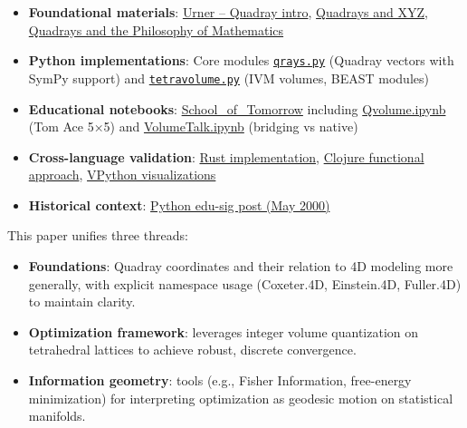 \documentclass[
]{article}
\providecommand{\tightlist}{%
  \setlength{\itemsep}{0pt}\setlength{\parskip}{0pt}}
\begin{document}
\begin{itemize}
\tightlist
\item
  \textbf{Foundational materials}:
  \href{https://www.grunch.net/synergetics/quadintro.html}{Urner --
  Quadray intro},
  \href{https://www.grunch.net/synergetics/quadxyz.html}{Quadrays and
  XYZ}, \href{https://www.grunch.net/synergetics/quadphil.html}{Quadrays
  and the Philosophy of Mathematics}
\item
  \textbf{Python implementations}: Core modules
  \href{https://github.com/4dsolutions/m4w/blob/main/qrays.py}{\texttt{qrays.py}}
  (Quadray vectors with SymPy support) and
  \href{https://github.com/4dsolutions/m4w/blob/main/tetravolume.py}{\texttt{tetravolume.py}}
  (IVM volumes, BEAST modules)
\item
  \textbf{Educational notebooks}:
  \href{https://github.com/4dsolutions/School_of_Tomorrow}{School\_of\_Tomorrow}
  including
  \href{https://github.com/4dsolutions/School_of_Tomorrow/blob/master/Qvolume.ipynb}{Qvolume.ipynb}
  (Tom Ace 5×5) and
  \href{https://github.com/4dsolutions/School_of_Tomorrow/blob/master/VolumeTalk.ipynb}{VolumeTalk.ipynb}
  (bridging vs native)
\item
  \textbf{Cross-language validation}:
  \href{https://github.com/4dsolutions/rusty_rays}{Rust implementation},
  \href{https://github.com/4dsolutions/synmods}{Clojure functional
  approach}, \href{https://github.com/4dsolutions/BookCovers}{VPython
  visualizations}
\item
  \textbf{Historical context}:
  \href{https://mail.python.org/pipermail/edu-sig/2000-May/000498.html}{Python
  edu-sig post (May 2000)}
\end{itemize}

This paper unifies three threads:

\begin{itemize}
\tightlist
\item
  \textbf{Foundations}: Quadray coordinates and their relation to 4D
  modeling more generally, with explicit namespace usage (Coxeter.4D,
  Einstein.4D, Fuller.4D) to maintain clarity.
\item
  \textbf{Optimization framework}: leverages integer volume quantization
  on tetrahedral lattices to achieve robust, discrete convergence.
\item
  \textbf{Information geometry}: tools (e.g., Fisher Information,
  free-energy minimization) for interpreting optimization as geodesic
  motion on statistical manifolds.
\end{itemize}
\end{document}
